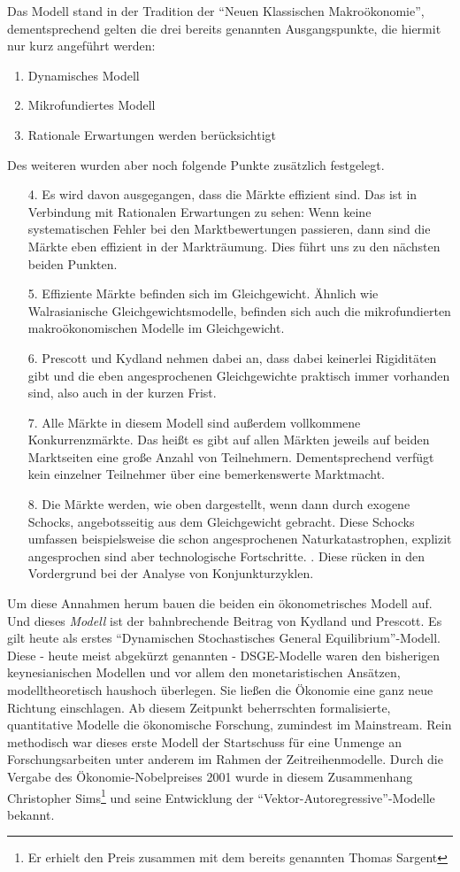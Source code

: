 Das Modell stand in der Tradition der "`Neuen Klassischen Makroökonomie"', dementsprechend gelten die drei bereits genannten Ausgangspunkte, die hiermit nur kurz angeführt werden:
\begin{enumerate}
\item Dynamisches Modell
\item Mikrofundiertes Modell
\item Rationale Erwartungen werden berücksichtigt
\end{enumerate}
Des weiteren wurden aber noch folgende Punkte zusätzlich festgelegt.
\begin{enumerate}
\item[4.] Es wird davon ausgegangen, dass die Märkte effizient sind. Das ist in Verbindung mit Rationalen Erwartungen zu sehen: Wenn keine systematischen Fehler bei den Marktbewertungen passieren, dann sind die Märkte eben effizient in der Markträumung. Dies führt uns zu den nächsten beiden Punkten.
\item[5.] Effiziente Märkte befinden sich im Gleichgewicht. Ähnlich wie Walrasianische Gleichgewichtsmodelle, befinden sich auch die mikrofundierten makroökonomischen Modelle im Gleichgewicht.
\item[6.] Prescott und Kydland nehmen dabei an, dass dabei keinerlei Rigiditäten gibt und die eben angesprochenen Gleichgewichte praktisch immer vorhanden sind, also auch in der kurzen Frist.
\item[7.] Alle Märkte in diesem Modell sind außerdem vollkommene Konkurrenzmärkte. Das heißt es gibt auf allen Märkten jeweils auf beiden Marktseiten eine große Anzahl von Teilnehmern. Dementsprechend verfügt kein einzelner Teilnehmer über eine bemerkenswerte Marktmacht.
\item[8.] Die Märkte werden, wie oben dargestellt, wenn dann durch exogene Schocks, angebotsseitig aus dem Gleichgewicht gebracht. Diese Schocks umfassen beispielsweise die schon angesprochenen Naturkatastrophen, explizit angesprochen sind aber technologische Fortschritte. \parencite[S. 1345]{Kydland1982}. Diese rücken in den Vordergrund bei der Analyse von Konjunkturzyklen.
\end{enumerate}

Um diese Annahmen herum bauen die beiden ein ökonometrisches Modell auf. Und dieses \textit{Modell} ist der bahnbrechende Beitrag von Kydland und Prescott. Es gilt heute als erstes "`Dynamischen Stochastisches General Equilibrium"'-Modell. Diese - heute meist abgekürzt genannten - DSGE-Modelle waren den bisherigen keynesianischen Modellen und vor allem den monetaristischen Ansätzen, modelltheoretisch haushoch überlegen. Sie ließen die Ökonomie eine ganz neue Richtung einschlagen. Ab diesem Zeitpunkt beherrschten formalisierte, quantitative Modelle die ökonomische Forschung, zumindest im Mainstream. Rein methodisch war dieses erste Modell der Startschuss für eine Unmenge an Forschungsarbeiten unter anderem im Rahmen der Zeitreihenmodelle. Durch die Vergabe des Ökonomie-Nobelpreises 2001 wurde in diesem Zusammenhang Christopher Sims\footnote{Er erhielt den Preis zusammen mit dem bereits genannten Thomas Sargent} und seine Entwicklung der "`Vektor-Autoregressive"'-Modelle bekannt.

